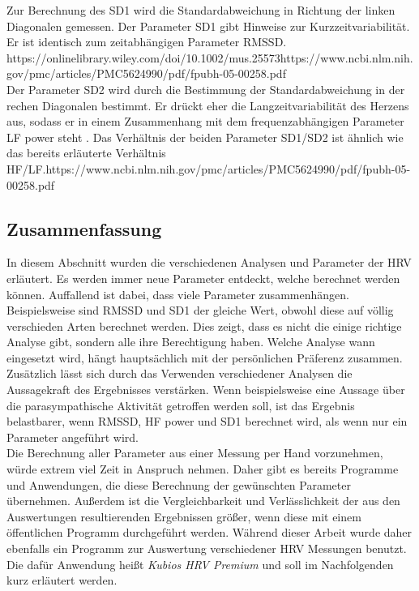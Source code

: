 Zur Berechnung des SD1 wird die Standardabweichung in Richtung der linken Diagonalen gemessen. Der Parameter SD1 gibt Hinweise zur Kurzzeitvariabilität. Er ist identisch zum zeitabhängigen Parameter RMSSD. https://onlinelibrary.wiley.com/doi/10.1002/mus.25573https://www.ncbi.nlm.nih.gov/pmc/articles/PMC5624990/pdf/fpubh-05-00258.pdf\\

Der Parameter SD2 wird durch die Bestimmung der Standardabweichung in der rechen Diagonalen bestimmt. Er drückt eher die Langzeitvariabilität des Herzens aus, sodass er in einem Zusammenhang mit dem frequenzabhängigen Parameter LF power steht . Das Verhältnis der beiden Parameter SD1/SD2 ist ähnlich wie das bereits erläuterte Verhältnis HF/LF.https://www.ncbi.nlm.nih.gov/pmc/articles/PMC5624990/pdf/fpubh-05-00258.pdf

\subsection{Zusammenfassung}

In diesem Abschnitt wurden die verschiedenen Analysen und Parameter der HRV erläutert. Es werden immer neue Parameter entdeckt, welche berechnet werden können. Auffallend ist dabei, dass viele Parameter zusammenhängen. Beispielsweise sind RMSSD und SD1 der gleiche Wert, obwohl diese auf völlig verschieden Arten berechnet werden. Dies zeigt, dass es nicht die einige richtige Analyse gibt, sondern alle ihre Berechtigung haben. Welche Analyse wann eingesetzt wird, hängt hauptsächlich mit der persönlichen Präferenz zusammen.\\
Zusätzlich lässt sich durch das Verwenden verschiedener Analysen die Aussagekraft des Ergebnisses verstärken. Wenn beispielsweise eine Aussage über die parasympathische Aktivität getroffen werden soll, ist das Ergebnis belastbarer, wenn RMSSD, HF power und SD1 berechnet wird, als wenn nur ein Parameter angeführt wird. \\

Die Berechnung aller Parameter aus einer Messung per Hand vorzunehmen, würde extrem viel Zeit in Anspruch nehmen. Daher gibt es bereits Programme und Anwendungen, die diese Berechnung der gewünschten Parameter übernehmen. Außerdem ist die Vergleichbarkeit und Verlässlichkeit der aus den Auswertungen resultierenden Ergebnissen größer, wenn diese mit einem öffentlichen Programm durchgeführt werden. Während dieser Arbeit wurde daher ebenfalls ein Programm zur Auswertung verschiedener HRV Messungen benutzt. Die dafür  Anwendung heißt \textit{Kubios HRV Premium} und soll im Nachfolgenden kurz erläutert werden. 

